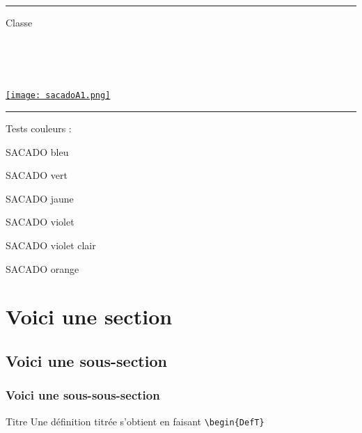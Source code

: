 \documentclass[a4paper,dvipsnames]{article}
\begin{document}

\fancyhead[C]{}
\hrule\medskip %
\begin{minipage}{0.295\textwidth} 
\raggedright
Classe \myClasse \hfill\\
\myDiscipline \hfill\\
\myParcours \hfill\\
\end{minipage}
\begin{minipage}{0.4\textwidth} 
\centering 
\scshape\huge
\textcolor{sacado_purple}{\myTitle} \\ 
\normalsize 
\end{minipage}
\begin{minipage}{0.295\textwidth} 
\raggedleft
\href{https://sacado.xyz/}{\texttt{[image: sacadoA1.png]}}
\end{minipage}
\medskip \hrule
\bigskip


Tests couleurs :

\textcolor{sacado_blue}{SACADO bleu}

\textcolor{sacado_green}{SACADO vert}

\textcolor{sacado_yellow}{SACADO jaune}

\textcolor{sacado_purple}{SACADO violet}

\textcolor{sacado_violet}{SACADO violet clair}

\textcolor{sacado_orange}{SACADO orange}



\section{Voici une section}

\subsection{Voici une sous-section}

\subsubsection{Voici une sous-sous-section}

\begin{DefT}{Titre}
Une définition titrée s'obtient en faisant \verb|\begin{DefT}|
\end{DefT}
\end{document}
